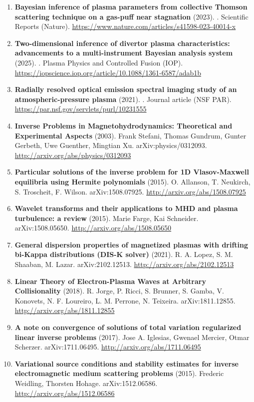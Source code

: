 \documentclass[11pt,a4paper]{article}
\begin{document}
\begin{enumerate}[leftmargin=1.4em]
\item \textbf{Bayesian inference of plasma parameters from collective Thomson scattering technique on a gas-puff near stagnation} (2023). . Scientific Reports (Nature). \url{https://www.nature.com/articles/s41598-023-40014-x}
\item \textbf{Two-dimensional inference of divertor plasma characteristics: advancements to a multi-instrument Bayesian analysis system} (2025). . Plasma Physics and Controlled Fusion (IOP). \url{https://iopscience.iop.org/article/10.1088/1361-6587/adab1b}
\item \textbf{Radially resolved optical emission spectral imaging study of an atmospheric-pressure plasma} (2021). . Journal article (NSF PAR). \url{https://par.nsf.gov/servlets/purl/10231555}
\item \textbf{Inverse Problems in Magnetohydrodynamics: Theoretical and Experimental Aspects} (2003). Frank Stefani, Thomas Gundrum, Gunter Gerbeth, Uwe Guenther, Mingtian Xu. arXiv:physics/0312093. \url{http://arxiv.org/abs/physics/0312093}
\item \textbf{Particular solutions of the inverse problem for 1D Vlasov-Maxwell equilibria using Hermite polynomials} (2015). O. Allanson, T. Neukirch, S. Troscheit, F. Wilson. arXiv:1508.07925. \url{http://arxiv.org/abs/1508.07925}
\item \textbf{Wavelet transforms and their applications to MHD and plasma turbulence: a review} (2015). Marie Farge, Kai Schneider. arXiv:1508.05650. \url{http://arxiv.org/abs/1508.05650}
\item \textbf{General dispersion properties of magnetized plasmas with drifting bi-Kappa distributions (DIS-K solver)} (2021). R. A. Lopez, S. M. Shaaban, M. Lazar. arXiv:2102.12513. \url{http://arxiv.org/abs/2102.12513}
\item \textbf{Linear Theory of Electron-Plasma Waves at Arbitrary Collisionality} (2018). R. Jorge, P. Ricci, S. Brunner, S. Gamba, V. Konovets, N. F. Loureiro, L. M. Perrone, N. Teixeira. arXiv:1811.12855. \url{http://arxiv.org/abs/1811.12855}
\item \textbf{A note on convergence of solutions of total variation regularized linear inverse problems} (2017). Jose A. Iglesias, Gwenael Mercier, Otmar Scherzer. arXiv:1711.06495. \url{http://arxiv.org/abs/1711.06495}
\item \textbf{Variational source conditions and stability estimates for inverse electromagnetic medium scattering problems} (2015). Frederic Weidling, Thorsten Hohage. arXiv:1512.06586. \url{http://arxiv.org/abs/1512.06586}

\end{enumerate}
\end{document}
